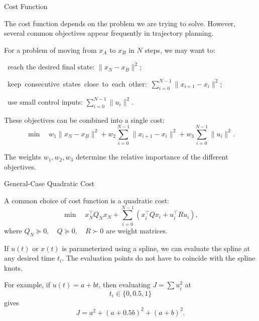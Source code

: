 \documentclass{beamer}
\begin{document}
\begin{frame}{Cost Function}
	\begin{flushleft}
		The cost function depends on the problem we are trying
		to solve. However, several common objectives appear
		frequently in trajectory planning.
		
		\vspace{0.5em}
		
		For a problem of moving from $x_A$ to $x_B$ in $N$ steps,
		we may want to:
		
			\textbullet  \, reach the desired final state: $\|x_N-x_B\|^2$;
			
			\textbullet  \, \mbox{keep consecutive states close to each other: $\sum\limits_{i=0}^{N-1}\|x_{i+1}-x_i\|^2$;}
			
			\textbullet  \, use small control inputs: $\sum_{i=0}^{N-1}\|u_i\|^2$.

		
		These objectives can be combined into a single cost:
		\[
		\min
		\quad
		w_1\|x_N-x_B\|^2
		+
		w_2\sum_{i=0}^{N-1}\|x_{i+1}-x_i\|^2
		+
		w_3\sum_{i=0}^{N-1}\|u_i\|^2.
		\]
		
		The weights $w_1,w_2,w_3$ determine the relative
		importance of the different objectives.
	\end{flushleft}
\end{frame}


\begin{frame}{General-Case Quadratic Cost}
	\begin{flushleft}
		A common choice of cost function is a quadratic cost:
		\[
		\min
		\quad
		x_N^\top Q_N x_N
		+
		\sum_{i=0}^{N-1}
		\left(
		x_i^\top Q x_i
		+
		u_i^\top R u_i
		\right),
		\]
		where $Q_N\succeq 0,
		\quad
		Q\succeq 0,
		\quad
		R\succ 0$
		are weight matrices.
		
		\vspace{0.5em}
		
		If $u(t)$ or $x(t)$ is parameterized using a spline,
		we can evaluate the spline at any desired time $t_i$. The evaluation points do not have to coincide with
		the spline knots.
		
		\vspace{0.5em}
		
		For example, if $u(t)=a+bt$,
		then evaluating $J = \sum u_i^2$ at
		\[
		t_i\in\{0,0.5,1\}
		\]
		gives
		\[
		J
		=
		a^2
		+
		(a+0.5b)^2
		+
		(a+b)^2.
		\]
	\end{flushleft}
\end{frame}
\end{document}
